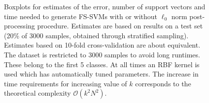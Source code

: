 \begin{figure}[!htb]
\begin{minipage}{\textwidth}
	\hfil
	\caption*{$k=6$}
\end{minipage}
\begin{minipage}{\textwidth}
        \centering
        \hfil
	\hfil
	\hfil
	\caption*{$k=8$}
\end{minipage}
\caption{Boxplots for estimates of the error, number of support vectors and time needed to generate FS-SVMs with or without $\ell_0$ norm post-processing procedure. Estimates are based on results on a test set (20\% of 3000 samples, obtained through stratified sampling). Estimates based on 10-fold cross-validation are about equivalent. The dataset is restricted to 3000 samples to avoid long runtimes. These belong to the first 5 classes. At all times an RBF kernel is used which has automatically tuned parameters. The increase in time requirements for increasing value of $k$ corresponds to the theoretical complexity $\mathcal{O}(k^2N^2)$.}
\label{shuttleestimates}
\end{figure}